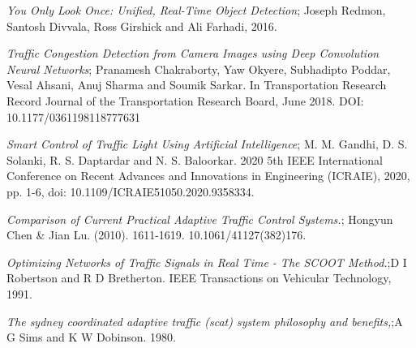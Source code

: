 \documentclass[openany,12pt]{report}
\begin{document}

	
	\begin{thebibliography}{99}
		
		\emph{You Only Look Once: Unified, Real-Time Object Detection}; Joseph Redmon, Santosh Divvala, Ross Girshick and Ali Farhadi, 2016.
		
		\emph{Traffic Congestion Detection from Camera Images using Deep Convolution Neural Networks}; Pranamesh Chakraborty, Yaw Okyere, Subhadipto Poddar, Vesal Ahsani, Anuj Sharma and Soumik Sarkar. In Transportation Research Record Journal of the Transportation Research Board, June 2018. DOI: 10.1177/0361198118777631
		
		\emph{Smart Control of Traffic Light Using Artificial Intelligence}; M. M. Gandhi, D. S. Solanki, R. S. Daptardar and N. S. Baloorkar. 2020 5th IEEE International Conference on Recent Advances and Innovations in Engineering (ICRAIE), 2020, pp. 1-6, doi: 10.1109/ICRAIE51050.2020.9358334.
		
		\emph{Comparison of Current Practical Adaptive Traffic Control Systems.}; Hongyun Chen \& Jian Lu. (2010). 1611-1619. 10.1061/41127(382)176. 
		
		\emph{Optimizing Networks of Traffic Signals in Real Time - The SCOOT Method.};D I Robertson and R D Bretherton. IEEE Transactions on Vehicular Technology, 1991.
		
		\emph{The sydney coordinated adaptive traffic (scat) system philosophy and benefits,};A G Sims and K W Dobinson. 1980.
		
	\end{thebibliography}
\end{document}
